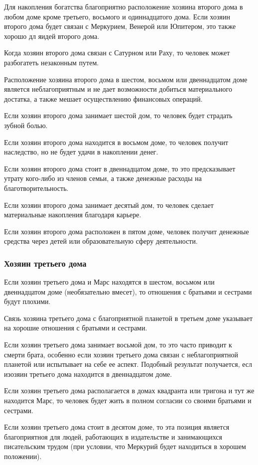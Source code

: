 Для накопления богатства благоприятно расположение хозяина второго дома в любом доме кроме третьего, восьмого и одиннадцатого дома. Если хозяин второго дома будет связан с Меркурием, Венерой или Юпитером, это также хорошо дл яидей второго дома.

Когда хозяин второго дома связан с Сатурном или Раху, то человек может разбогатеть незаконным путем.

Расположение хозяина второго дома в шестом, восьмом или двеннадцатом доме является неблагоприятным и не дает возможности добиться материального достатка, а также мешает осуществлению финансовых операций.

Если хозяин второго дома занимает шестой дом, то человек будет страдать зубной болью.

Если хозяин второго дома находится в восьмом доме, то человек получит наследство, но не будет удачи в накоплении денег.

Если хозяин второго дома стоит в двеннадцатом доме, то это предсказывает утрату кого-либо из членов семьи, а также денежные расходы на благотворительность.

Если хозяин второго дома занимает десятый дом, то человек сделает материальные накопления благодаря карьере.

Если хозяин второго дома расположен в пятом доме, человек получит денежные средства через детей или образовательную сферу деятельности.

\subsubsection*{Хозяин третьего дома}
Если хозяин третьего дома и Марс находятся в шестом, восьмом или двеннадцатом доме (необязательно вмесет), то  отношения с братьями и сестрами будут плохими.

Связь хозяина третьего дома с благоприятной планетой в третьем доме указывает на хорошие отношения с братьями и сестрами.

Если хозяин третьего дома занимает восьмой дом, то это часто приводит к смерти брата, особенно если хозяин третьего дома связан с неблагоприятной планетой или испытывает на себе ее аспект. Подобный результат получается, есл изозяин третьего дома находится в двеннадцатом доме.

Если хозяин третьего дома располагается в домах квадранта или тригона и тут же находится Марс, то человек будет жить в полном согласии со своими братьями и сестрами.

Если хозяин третьего дома стоит в десятом доме, то эта позиция является благоприятноя для людей, работающих в издательстве и занимающихся писательским трудом (при условии, что Меркурий будет находиться в хорошем положении).



